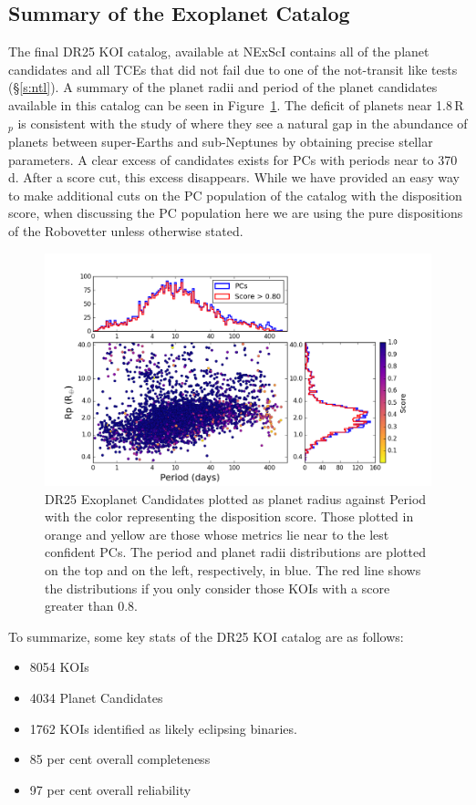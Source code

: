 \subsection{Summary of the Exoplanet Catalog}

The final DR25 KOI catalog, available at NExScI contains all of the planet candidates and all TCEs that did not fail due to one of the not-transit like tests (\S\ref{s:ntl}). A summary of the planet radii and period of the planet candidates available in this catalog can be seen in Figure~\ref{f:catalogPlot}. The deficit of planets near 1.8\,R$_{p}$ is consistent with the study of \citet{Fulton2017} where they see a natural gap in the abundance of planets between super-Earths and sub-Neptunes by obtaining precise stellar parameters. A clear excess of candidates exists for PCs with periods near to 370\,d.  After a score cut, this excess disappears. While we have provided an easy way to make additional cuts on the PC population of the catalog with the disposition score, when discussing the PC population here we are using the pure dispositions of the Robovetter unless otherwise stated.


\begin{figure}
    \centering
    \includegraphics[width=0.9\linewidth]{fig-radiusPeriodScore-hist.png}
    \caption{DR25 Exoplanet Candidates plotted as planet radius against Period with the color representing the disposition score. Those plotted in orange and yellow are those whose metrics lie near to the lest confident PCs.  The period and planet radii distributions are plotted on the top and on the left, respectively, in blue. The red line shows the distributions if you only consider those KOIs with a score greater than 0.8. }
    \label{f:catalogPlot}
\end{figure}

To summarize, some key stats of the DR25 KOI catalog are as follows:
\begin{itemize}
    \item 8054 KOIs
    \item 4034 Planet Candidates
    \item 1762 KOIs identified as likely eclipsing binaries.
    \item 85 per cent overall completeness
    \item 97 per cent overall reliability
\end{itemize}




